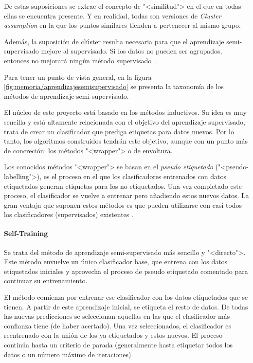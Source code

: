 De estas suposiciones se extrae el concepto de "<similitud"> en el que en todas
ellas se encuentra presente. Y en realidad, todas son versiones de
\textit{Cluster assumption} en la que los puntos similares tienden a pertenecer
al mismo grupo. 

Además, la suposición de clúster resulta necesaria para que el aprendizaje
semi-supervisado mejore al supervisado. Si los datos no pueden ser agrupados,
entonces no mejorará ningún método supervisado~\cite{vanEngelen2020}.


Para tener un punto de vista general, en la figura \ref{fig:memoria/aprendizajesemisupervisado} se presenta la
taxonomía de los métodos de aprendizaje semi-supervisado.


El núcleo de este proyecto está basado en los métodos inductivos. Su idea es muy
sencilla y está altamente relacionada con el objetivo del aprendizaje
supervisado, trata de crear un clasificador que prediga etiquetas para datos
nuevos. Por lo tanto, los algoritmos construidos tendrán este objetivo, aunque
con un punto más de concreción: los métodos "<wrapper"> o de envoltura.

Los conocidos métodos "<wrapper"> se basan en el \textit{pseudo etiquetado}
("<pseudo-labelling">), es el proceso en el que los clasificadores entrenados
con datos etiquetados generan etiquetas para los no etiquetados. Una vez
completado este proceso, el clasificador se vuelve a entrenar pero añadiendo
estos nuevos datos. La gran ventaja que suponen estos métodos es que pueden
utilizarse con casi todos los clasificadores (supervisados) existentes
\cite{vanEngelen2020}.

\paragraph{Self-Training}
Se trata del método de aprendizaje semi-supervisado más sencillo y "<directo">.
Este método envuelve un único clasificador base, que entrena con los datos
etiquetados iniciales y aprovecha el proceso de pseudo etiquetado comentado para
continuar su entrenamiento.

El método comienza por entrenar ese clasificador con los datos etiquetados que
se tienen. A partir de este aprendizaje inicial, se etiqueta el resto de datos.
De todas las nuevas predicciones se seleccionan aquellas en las que el
clasificador más confianza tiene (de haber acertado). Una vez seleccionados, el
clasificador es reentrenado con la unión de los ya etiquetados y estos nuevos.
El proceso continúa hasta un criterio de parada (generalmente hasta etiquetar
todos los datos o un número máximo de iteraciones).

